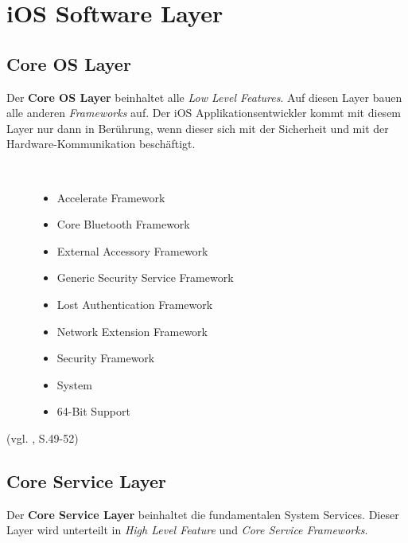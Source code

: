\section{iOS Software Layer}
\label{sec:iOSSWLayer}

\subsection{Core OS Layer}
\label{sec:CoreLayer}

Der \textbf{Core OS Layer} beinhaltet alle \textit{\glqq Low Level Features\grqq}. Auf diesen Layer bauen alle anderen \textit{\glqq Frameworks\grqq{}} auf. Der iOS Applikationsentwickler kommt mit diesem Layer nur dann in Berührung, wenn dieser sich mit der Sicherheit und mit der Hardware-Kommunikation beschäftigt. 
\begin{description}
	\item[\parbox{\textwidth} {Das Core OS Layer Framework beinhaltet folgende Frameworks}]~\par
	\begin{itemize}
		\item Accelerate Framework
		\item Core Bluetooth Framework
		\item External Accessory Framework
		\item Generic Security Service Framework
		\item Lost Authentication Framework
		\item Network Extension Framework
		\item Security Framework
		\item System
		\item 64-Bit Support
	\end{itemize}
\end{description}
 (vgl. \cite{Apple[6]}, S.49-52) 
 
\subsection{Core Service Layer}
\label{sec:CoreServiceLayer}		
Der \textbf{Core Service Layer} beinhaltet die fundamentalen System Services. Dieser Layer wird unterteilt in \textit{\glqq High Level Feature\grqq{}} und \textit{\glqq Core Service Frameworks\grqq{}}.

